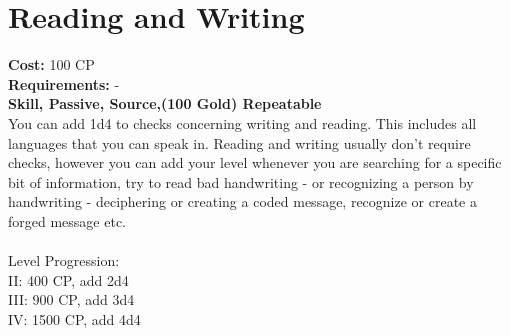 \section{Reading and Writing}
\textbf{Cost:} 100 CP\\
\textbf{Requirements:} -\\
\textbf{Skill, Passive, Source,(100 Gold) Repeatable}\\
You can add 1d4 to checks concerning writing and reading. This includes all languages that you can speak in. Reading and writing usually don't require checks, however you can add your level whenever you are searching for a specific bit of information, try to read bad handwriting - or recognizing a person by handwriting - deciphering or creating a coded message, recognize or create a forged message etc.\\
\\
Level Progression:\\
II: 400 CP, add 2d4\\
III: 900 CP, add 3d4\\
IV: 1500 CP, add 4d4\\